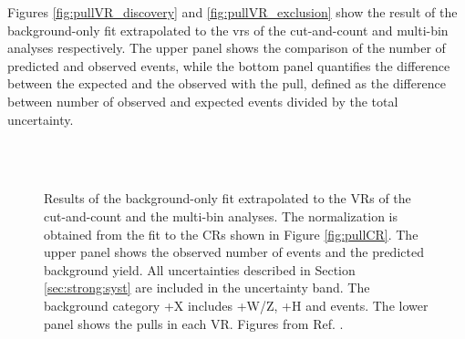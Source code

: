 Figures \ref{fig:pullVR_discovery} and \ref{fig:pullVR_exclusion} show the result of the background-only fit extrapolated to the \glspl{vr} of 
the cut-and-count and multi-bin analyses respectively. The upper panel shows the comparison of the number of predicted and observed events, 
while the bottom panel quantifies the difference between the expected and the observed with the pull, defined as the difference between 
number of observed and expected events divided by the total uncertainty. 

\begin{figure}[htbp]
	\centering
	\\
	\\
	\caption{Results of the background-only fit extrapolated to the VRs of  the cut-and-count and 
		the multi-bin analyses. The \ttbar normalization 
		is obtained from the fit to the CRs shown in Figure \ref{fig:pullCR}. The upper panel shows 
		the observed number of events and the predicted background yield.
		All uncertainties  described in Section \ref{sec:strong:syst} are included in the 
		uncertainty band. The background category \ttbar+X includes \ttbar+W/Z, 
		\ttbar+H and \ttbar\ttbar events. The lower panel shows the pulls in 
		each VR.  Figures from Ref. \cite{Aaboud:2017hrg}.
	} 
	\label{fig:pullVR}
\end{figure}

